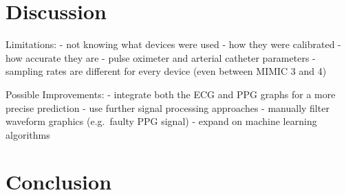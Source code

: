 \documentclass[12pt, bibliography=totoc]{scrartcl}
\begin{document}
\section{Discussion}
\label{sec:discussion}

Limitations:
- not knowing what devices were used
- how they were calibrated
- how accurate they are
- pulse oximeter and arterial catheter parameters
- sampling rates are different for every device (even between MIMIC 3 and 4)

Possible Improvements:
- integrate both the ECG and PPG graphs for a more precise prediction
- use further signal processing approaches
- manually filter waveform graphics (e.g.\ faulty PPG signal)
- expand on machine learning algorithms

\section{Conclusion}
\label{sec:conclusion}



\end{document}
